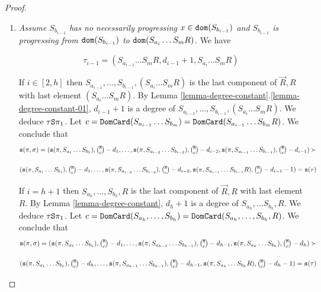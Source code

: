 \documentclass{lmcs}
\begin{document}
\begin{proof}
\begin{enumerate}
\begin{enumerate}
\item
\emph{Assume $S_{b_{i-1}}$ has no necessarily progressing
$x \in {\tt dom}(S_{b_{i-1}})$ and $S_{b_{i-1}}$ is progressing from ${\tt dom}(S_{b_{i-1}})$ 
to ${\tt dom}(S_{a_i} \ldots S_{m}R)$}.
We have

$$
\tau_{i-1}
= 
(S_{a_{i-1}} \ldots S_m R, d_{i-1}+1, S_{a_{i}} \ldots S_m R)
$$

If $i \in [2,h]$ then $S_{a_{i-1}}, \ldots, S_{b_{i-1}}, (S_{a_i} \ldots S_m R)$
 is the last component of $\vec{R},R$ with last element $(S_{a_i} \ldots S_m R)$. 
 By Lemma \ref{lemma-degree-constant}.\ref{lemma-degree-constant-01},
 $d_{i-1}+1$ is a degree of $S_{a_{i-1}}, \ldots, S_{b_{i-1}}, (S_{a_i} \ldots S_m R)$. 
 We deduce $\tau {\tt S} \pi_1$.
 Let 
 $
 c = {\tt DomCard}(S_{a_{i-1}}\ldots S_{b_{m}}) = {\tt DomCard}(S_{a_{i-1}} \ldots S_{b_{m}} R) 
 $. 
 We conclude that 
 $$
 \size(\pi,\sigma) 
 = 
 (\size(\pi,S_{a_{1}}\ldots S_{b_{1}}),  \newton{\MaxInd}{c}-d_1, 
 \ldots,  
 \size(\pi,S_{a_{i-2}}\ldots S_{b_{i-2}}),  \newton{\MaxInd}{c}-d_{i-2}, 
 \size(\pi,S_{a_{i-1}}\ldots S_{b_{i-1}}),  \newton{\MaxInd}{c}-d_{i-1})
  \succ
  $$
  
  $$
  (\size(\pi,S_{a_{1}}\ldots S_{b_{1}}),  \newton{\MaxInd}{c}-d_1, 
 \ldots,  
 \size(\pi,S_{a_{i-2}}\ldots S_{b_{i-2}}),  \newton{\MaxInd}{c}-d_{i-2}, 
 \size(\pi,S_{a_{i-1}}\ldots S_{b_{i-1}}R),  \newton{\MaxInd}{c}-d_{i-1}-1)
 = 
 \size(\tau)
 $$
 
If $i = h+1$ then $S_{a_{h}}, \ldots, S_{b_{h}}, R$ is the last component of $\vec{R},R$ 
with last element $R$. 
By Lemma \ref{lemma-degree-constant}, $d_{h}+1$ 
is a degree of $S_{a_{h}},\ldots S_{b_{h}},R$. We deduce $\tau {\tt S} \pi_1$.
Let 
$c = {\tt DomCard}(S_{a_{h}},\ldots, S_{b_{h}}) = {\tt DomCard}(S_{a_{h}},\ldots, S_{b_{h}},R) $. We conclude that  
 $$
 \size(\pi,\sigma) 
 =
 (\size(\pi,S_{a_{1}}\ldots S_{b_{1}}),  \newton{\MaxInd}{c}-d_1, 
 \ldots,  
 \size(\pi,S_{a_{h-1}}\ldots S_{b_{h-1}}),  \newton{\MaxInd}{c}-d_{h-1}, 
 \size(\pi,S_{a_{h}}\ldots S_{b_{h}}),  \newton{\MaxInd}{c}-d_{h})
  \succ
$$

$$
  (\size(\pi,S_{a_{1}}\ldots S_{b_{1}}),  \newton{\MaxInd}{c}-d_{h}, 
 \ldots,  
 \size(\pi,S_{a_{h-1}}\ldots S_{b_{h-1}}),  \newton{\MaxInd}{c}-d_{h-1}, 
 \size(\pi,S_{a_{h}}\ldots S_{b_{h}}R),  \newton{\MaxInd}{c}-d_{h}-1)
 = 
 \size(\tau)
 $$
\end{enumerate}
\end{enumerate}
\end{proof}

\end{document}
